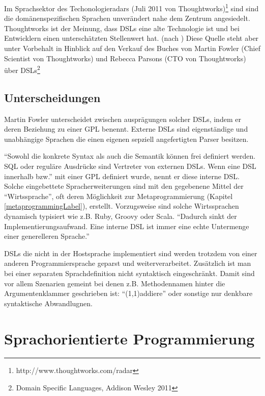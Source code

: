 \documentclass[11pt,english,ngerman, headsepline]{scrreprt}
\begin{document}

 
Im Sprachsektor des Techonologieradars (Juli 2011 von
Thoughtworks)\footnote{http://www.thoughtworks.com/radar}
sind sind die domänenspezifischen Sprachen unverändert nahe dem Zentrum
angesiedelt. Thoughtworks ist der Meinung, dass DSLs eine alte Technologie ist
und bei Entwicklern einen unterschätzten Stellenwert
hat. (nach \cite{thoughtworks-tr}) Diese Quelle steht aber unter Vorbehalt in
Hinblick auf den Verkauf des Buches von Martin Fowler (Chief Scientist von
Thoughtworks) und Rebecca Parsons (CTO von Thoughtworks) über DSLs\footnote{Domain Specific
Languages, Addison Wesley 2011} 


\subsection{Unterscheidungen}

Martin Fowler unterscheidet zwischen ausprägungen solcher DSLs, indem er deren
Beziehung zu einer GPL benennt. Externe DSLs sind eigenständige und unabhängige
Sprachen die einen eigenen sepziell angefertigten Parser besitzen. 

``Sowohl die konkrete Syntax als auch die Semantik können frei definiert
werden. SQL oder reguläre Ausdrücke sind Vertreter von externen DSLs. Wenn eine
DSL innerhalb bzw.'' \cite{wikidsl}
mit einer GPL definiert wurde, nennt er diese interne DSL. Solche eingebettete
Spracherweiterungen sind mit den gegebenene Mittel der ``Wirtssprache'', oft deren Möglichkeit zur
Metaprogrammierung (Kapitel \ref{metaprogrammingLabel}), erstellt.
Vorzugsweise sind solche Wirtssprachen dynamisch typisiert wie z.B. Ruby, Groovy
oder Scala. 
``Dadurch sinkt der Implementierungsaufwand. Eine interne DSL ist immer eine echte
Untermenge einer generelleren Sprache.'' \cite{wikidsl}

DSLs die nicht in der Hostsprache implementiert sind werden trotzdem von einer
anderen Programmiersprache geparst und weiterverarbeitet. Zusätzlich ist man bei
einer separaten Sprachdefinition nicht syntaktisch eingeschränkt. Damit sind vor
allem Szenarien gemeint bei denen z.B. Methodennamen hinter die
Argumentenklammer geschrieben ist: ``(1,1)addiere'' oder sonstige nur denkbare
syntaktische Abwandlugnen.


 

\section{Sprachorientierte Programmierung}
\end{document}
